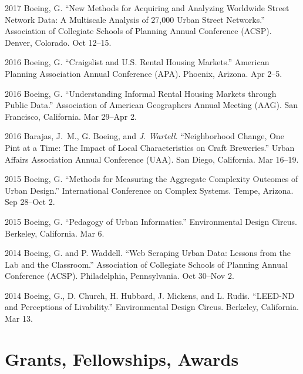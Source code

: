 \documentclass[12pt,letterpaper]{report}
\begin{document}
\begin{tablist}
		\item[2017] \tab Boeing, G. \enquote{New Methods for Acquiring and Analyzing Worldwide Street Network Data: A Multiscale Analysis of 27,000 Urban Street Networks.} Association of Collegiate Schools of Planning Annual Conference (ACSP). Denver, Colorado. Oct 12--15.
		
		\item[2016] \tab Boeing, G. \enquote{Craigslist and U.S. Rental Housing Markets.} American Planning Association Annual Conference (APA). Phoenix, Arizona. Apr 2--5.
		
		\item[2016] \tab Boeing, G. \enquote{Understanding Informal Rental Housing Markets through Public Data.} Association of American Geographers Annual Meeting (AAG). San Francisco, California. Mar 29--Apr 2.
		
		\item[2016] \tab Barajas, J.~M., G. Boeing, and \textit{J. Wartell}. \enquote{Neighborhood Change, One Pint at a Time: The Impact of Local Characteristics on Craft Breweries.} Urban Affairs Association Annual Conference (UAA). San Diego, California. Mar 16--19.
		
		\item[2015] \tab Boeing, G. \enquote{Methods for Measuring the Aggregate Complexity Outcomes of Urban Design.} International Conference on Complex Systems. Tempe, Arizona. Sep 28--Oct 2.
		
		\item[2015] \tab Boeing, G. \enquote{Pedagogy of Urban Informatics.} Environmental Design Circus. Berkeley, California. Mar 6.
		
		\item[2014] \tab Boeing, G. and P. Waddell. \enquote{Web Scraping Urban Data: Lessons from the Lab and the Classroom.} Association of Collegiate Schools of Planning Annual Conference (ACSP). Philadelphia, Pennsylvania. Oct 30--Nov 2.
		
		\item[2014] \tab Boeing, G., D. Church, H. Hubbard, J. Mickens, and L. Rudis. \enquote{LEED-ND and Perceptions of Livability.} Environmental Design Circus. Berkeley, California. Mar 13.
		
	\end{tablist}
	
	
	
	\section*{Grants, Fellowships, Awards}
	
\end{document}
